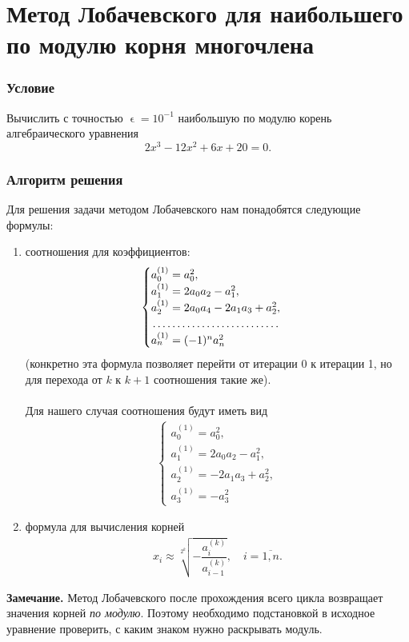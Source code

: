 \documentclass[a4paper, 12pt]{article}
\renewcommand{\epsilon}{\upvarepsilon}
\begin{document}
	\section*{Метод Лобачевского для наибольшего по модулю корня многочлена}
	\subsubsection*{Условие}
	Вычислить с точностью $\epsilon=10^{-1}$ наибольшую по модулю корень алгебраического уравнения $$2x^3-12x^2+6x +20 = 0.$$
	\subsubsection*{Алгоритм решения}
	Для решения задачи методом Лобачевского нам понадобятся следующие формулы:
	\begin{enumerate}
		\item соотношения для коэффициентов: 
		\begin{eqnarray}
		\begin{cases}
				a_0^{(1)} = a_0^2,\\
				a_1^{(1)} =2a_0a_2 - a_1^2,\\
				a_2^{(1)} = 2a_0a_4 - 2a_1a_3 + a_2^2,\\
				\dotfill\\
				a_n^{(1)} = (-1)^na_n^2
		\end{cases}
		\end{eqnarray}
		(конкретно эта формула позволяет перейти от итерации 0 к итерации 1, но для перехода от $k$ к $k+1$ соотношения такие же).\\\\
		Для нашего случая соотношения будут иметь вид
		\begin{eqnarray}
			\begin{cases}
			a_0^{(1)} = a_0^2,\\
			a_1^{(1)} =2a_0a_2 - a_1^2,\\
			a_2^{(1)} = - 2a_1a_3 + a_2^2,\\
			a_3^{(1)} = -a_3^2
		\end{cases}
		\end{eqnarray}
		\item формула для вычисления корней \begin{eqnarray}
			x_i\approx\sqrt[2^k]{ - \dfrac{a_i^{(k)}}{a_{i-1}^{(k)}}},\quad i =\overline{1,n}.
		\end{eqnarray}
	\end{enumerate} 
	\textbf{Замечание.} Метод Лобачевского после прохождения всего цикла возвращает значения корней \textit{по модулю}. Поэтому необходимо подстановкой в исходное уравнение проверить, с каким знаком нужно раскрывать модуль.\\\\
\end{document}
